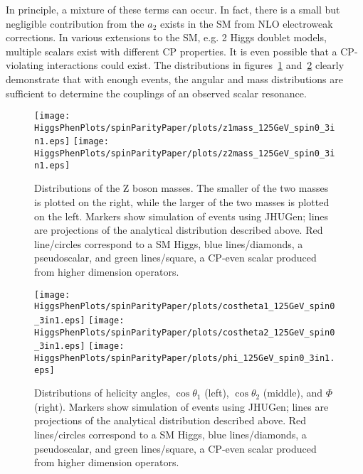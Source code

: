 In principle,
a mixture of these terms can occur.  In fact, there is a small but 
negligible contribution from the $a_2$ exists in the SM from NLO 
electroweak corrections.  In various extensions to the SM, e.g. 
2 Higgs doublet models, multiple scalars exist with different CP properties.  
It is even possible that a CP-violating interactions could exist.  The 
distributions in figures~\ref{fig:ScalarMasses} 
and~\ref{fig:ScalarHelicityAngles} clearly demonstrate that with 
enough events, the angular and mass distributions are sufficient to 
determine the couplings of an observed scalar resonance.  

\begin{figure}
\begin{center}
\texttt{[image: HiggsPhenPlots/spinParityPaper/plots/z1mass\_125GeV\_spin0\_3in1.eps]}
\texttt{[image: HiggsPhenPlots/spinParityPaper/plots/z2mass\_125GeV\_spin0\_3in1.eps]}
\caption{Distributions of the Z boson masses.  The smaller of the two masses is
plotted on the right, while the larger of the two masses is plotted on the
left. Markers show simulation of events using JHUGen; lines are projections
of the analytical distribution described above.  Red line/circles correspond
to a SM Higgs, blue lines/diamonds, a pseudoscalar, and green lines/square, 
a CP-even scalar produced from higher dimension operators.}
\label{fig:ScalarMasses}
\end{center}
\end{figure}

\begin{figure}
\begin{center}
\texttt{[image: HiggsPhenPlots/spinParityPaper/plots/costheta1\_125GeV\_spin0\_3in1.eps]}
\texttt{[image: HiggsPhenPlots/spinParityPaper/plots/costheta2\_125GeV\_spin0\_3in1.eps]}
\texttt{[image: HiggsPhenPlots/spinParityPaper/plots/phi\_125GeV\_spin0\_3in1.eps]}
\caption{Distributions of helicity angles, $\cos\theta_1$ (left), 
$\cos\theta_2$ (middle), and $\Phi$ (right). Markers show simulation of 
events using JHUGen; lines are projections
of the analytical distribution described above.  Red lines/circles correspond
to a SM Higgs, blue lines/diamonds, a pseudoscalar, and green lines/square, 
a CP-even scalar produced from higher dimension operators.}
\label{fig:ScalarHelicityAngles}
\end{center}
\end{figure}

